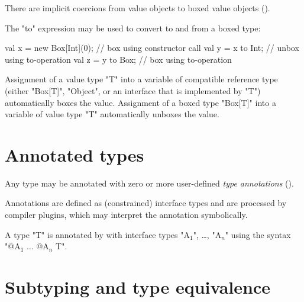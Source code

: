 There are implicit coercions from value objects to boxed value
objects ().


The \xcd"to" expression may be used to convert to and from a
boxed type:

\begin{xten}
val x = new Box[Int](0); // box using constructor call
val y = x to Int;        // unbox using to-operation
val z = y to Box;        // box using to-operation
\end{xten}

Assignment of a value type \xcd"T" into a variable of compatible reference type
(either \xcd"Box[T]", \xcd"Object", or an interface that is
implemented by \xcd"T")
automatically boxes the value.  Assignment of a boxed type
\xcd"Box[T]" into
a variable of value type \xcd"T" automatically unboxes the value.



\section{Annotated types}
\label{AnnotatedTypes}


        Any \Xten{} type may be annotated with zero or more
        user-defined \emph{type annotations}
        ().  

        Annotations are defined as (constrained) interface types and are
        processed by compiler plugins, which may interpret the
        annotation symbolically.

        A type \xcd"T" is annotated by with interface types
        \xcdmath"A$_1$", \dots,
        \xcdmath"A$_n$"
        using the syntax
        \xcdmath"@A$_1$ $\dots$ @A$_n$ T".

\section{Subtyping and type equivalence}\label{DepType:Equivalence}

